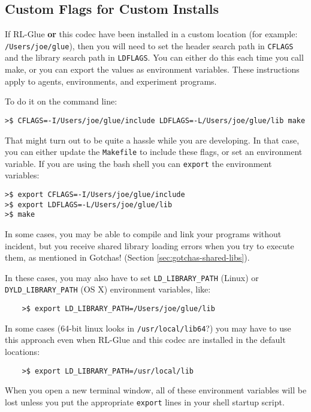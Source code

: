 \documentclass[11pt]{article}
\begin{document}
\subsection{Custom Flags for Custom Installs}
\label{sec:custom-flags}
If RL-Glue \textbf{or} this codec have been installed in a custom location (for example: \texttt{/Users/joe/glue}), then you will
need to set the header search path in \texttt{CFLAGS} and the library search path in \texttt{LDFLAGS}.  You can either do this each time you call make, 
or you can export the values as environment variables.  These instructions apply to agents, environments, and experiment programs.

To do it on the command line:
\begin{verbatim}
>$ CFLAGS=-I/Users/joe/glue/include LDFLAGS=-L/Users/joe/glue/lib make
\end{verbatim}

That might turn out to be quite a hassle while you are developing.  In that case, you can either update the \texttt{Makefile} to include these flags, 
or set an environment variable.  If you are using the bash shell you can \texttt{export} the environment variables:
\begin{verbatim}
>$ export CFLAGS=-I/Users/joe/glue/include
>$ export LDFLAGS=-L/Users/joe/glue/lib
>$ make
\end{verbatim}

In some cases, you may be able to compile and link your programs without incident, but you receive shared library loading errors when you try to execute them, as mentioned in Gotchas! (Section \ref{sec:gotchas-shared-libs}).

In these cases, you may also have to set \texttt{LD\_LIBRARY\_PATH} (Linux) or \texttt{DYLD\_LIBRARY\_PATH} (OS X) environment variables, like:
\begin{verbatim}
	>$ export LD_LIBRARY_PATH=/Users/joe/glue/lib
\end{verbatim}

In some cases (64-bit linux looks in \texttt{/usr/local/lib64}?) you may have to use this approach even when RL-Glue and this codec are installed in the default locations:
\begin{verbatim}
	>$ export LD_LIBRARY_PATH=/usr/local/lib
\end{verbatim}

When you open a new terminal window, all of these environment variables will be lost unless you put the appropriate \texttt{export} lines in your shell startup script.
\end{document}

